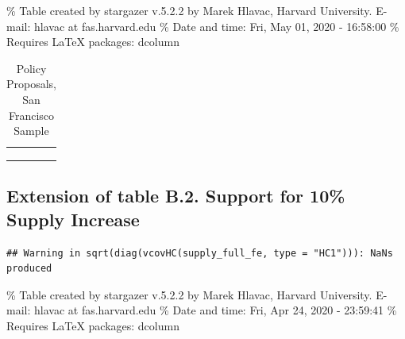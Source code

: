 \documentclass[]{article}
\begin{document}
\% Table created by stargazer v.5.2.2 by Marek Hlavac, Harvard University. E-mail: hlavac at fas.harvard.edu
\% Date and time: Fri, May 01, 2020 - 16:58:00
\% Requires LaTeX packages: dcolumn

\begin{table}[H] \centering 
  \caption{Policy Proposals, San Francisco Sample} 
  \label{sf_policies} 
\small 
\begin{tabular}{@{\extracolsep{5pt}} D{.}{.}{-2} } 
\\[-1.8ex]\hline 
\hline \\[-1.8ex] 
 \\ 
\hline \\[-1.8ex] 
\end{tabular} 
\end{table}

\hypertarget{extension-of-table-b.2.-support-for-10-supply-increase}{%
\subsection{Extension of table B.2. Support for 10\% Supply Increase}\label{extension-of-table-b.2.-support-for-10-supply-increase}}

\begin{verbatim}
## Warning in sqrt(diag(vcovHC(supply_full_fe, type = "HC1"))): NaNs produced
\end{verbatim}

\% Table created by stargazer v.5.2.2 by Marek Hlavac, Harvard University. E-mail: hlavac at fas.harvard.edu
\% Date and time: Fri, Apr 24, 2020 - 23:59:41
\% Requires LaTeX packages: dcolumn
\end{document}
